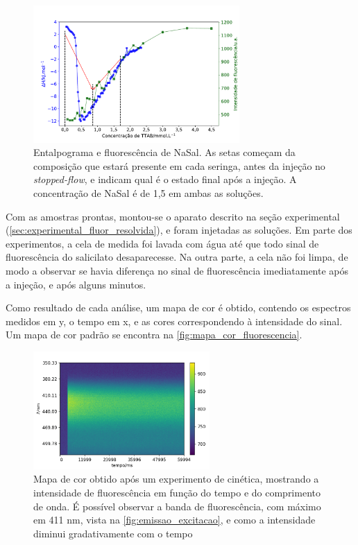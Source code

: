 	\begin{figure}[h]
		\centering
		\includegraphics[width=0.7\textwidth]{imagens/fluor/itc_experimento_cinetica}
		\caption{Entalpograma e fluorescência de NaSal. As setas começam da composição que estará presente em cada seringa, antes da injeção no \emph{stopped-flow}, e indicam qual é o estado final após a injeção. A concentração de NaSal é de 1,5 \mM{} em ambas as soluções.}
		\label{fig:itc_experimento_cinetica}
	\end{figure}
	
	Com as amostras prontas, montou-se o aparato descrito na seção experimental (\autoref{sec:experimental_fluor_resolvida}), e foram injetadas as soluções. Em parte dos experimentos, a cela de medida foi lavada com água até que todo sinal de fluorescência do salicilato desaparecesse. Na outra parte, a cela não foi limpa, de modo a observar se havia diferença no sinal de fluorescência imediatamente após a injeção, e após alguns minutos.
	
	Como resultado de cada análise, um mapa de cor é obtido, contendo os espectros medidos em y, o tempo em x, e as cores correspondendo à intensidade do sinal. Um mapa de cor padrão se encontra na \autoref{fig:mapa_cor_fluorescencia}.
	
	\begin{figure}[h]
		\centering
		\includegraphics[width=0.6\textwidth]{imagens/fluor/mapa_cor_am49}
		\caption{Mapa de cor obtido após um experimento de cinética, mostrando a intensidade de fluorescência em função do tempo e do comprimento de onda. É possível observar a banda de fluorescência, com máximo em 411 nm, vista na \autoref{fig:emissao_excitacao}, e como a intensidade diminui gradativamente com o tempo}
		\label{fig:mapa_cor_fluorescencia}
	\end{figure}
	
